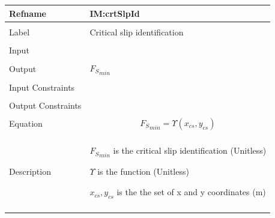 \documentclass[12pt]{article}
\begin{document}
 \noindent \begin{minipage}{\textwidth}
\begin{tabular}{p{} p{}}
\toprule \textbf{Refname} & \textbf{IM:crtSlpId}
\label{IM:crtSlpId}
\\ \midrule \\
Label & Critical slip identification
        \\ \midrule \\
        Input & \\ \midrule \\
                Output & ${{F_{S}}_{min}}$
                         \\ \midrule \\
                         Input Constraints & \\ \midrule \\
                                             Output Constraints & \\ \midrule \\
                                                                  Equation & \begin{displaymath}
                                                                             {{F_{S}}_{min}}=Υ\left({x_{cs}},{y_{cs}}\right)
                                                                             \end{displaymath}
                                                                             \\ \midrule \\
                                                                             Description & \begin{symbDescription}
                                                                                           \item{${{F_{S}}_{min}}$ is the critical slip identification (Unitless)}
                                                                                           \item{$Υ$ is the function (Unitless)}
                                                                                           \item{${x_{cs}},{y_{cs}}$ is the the set of x and y coordinates (m)}
                                                                                           \end{symbDescription}
                                                                                           \\ \midrule \\

\end{tabular}
\end{minipage}
\end{document}
